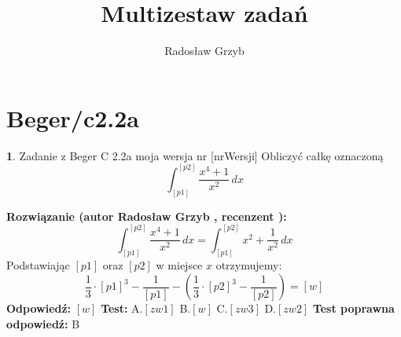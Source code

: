 \documentclass[12pt, a4paper]{article}
\title{Multizestaw zadań}
\author{Radosław Grzyb}
\date{}
\theoremstyle{definition} %
\newtheorem{zad}{}
\newcommand{\kategoria}[1]{\section{#1}} %
\newcommand{\zadStart}[1]{\begin{zad}#1\newline} %
\newcommand{\zadStop}{\end{zad}}   %
\newcommand{\rozwStart}[2]{\noindent \textbf{Rozwiązanie (autor #1 , recenzent #2): }\newline} %
\newcommand{\rozwStop}{\newline}                                            %
\newcommand{\odpStart}{\noindent \textbf{Odpowiedź:}\newline}    %
\newcommand{\odpStop}{\newline}                                             %
\newcommand{\testStart}{\noindent \textbf{Test:}\newline} %
\newcommand{\testStop}{\newline} %
\newcommand{\kluczStart}{\noindent \textbf{Test poprawna odpowiedź:}\newline} %
\newcommand{\kluczStop}{\newline} %
\begin{document}
\maketitle
\kategoria{Beger/c2.2a}
\zadStart{Zadanie z Beger C 2.2a moja wersja nr [nrWersji]}
Obliczyć całkę oznaczoną
$$\int_{[p1]}^{[p2]} \frac{x^{4}+1}{x^{2}} \,dx$$
\zadStop
\rozwStart{Radosław Grzyb}{}
$$\int_{[p1]}^{[p2]} \frac{x^{4}+1}{x^{2}} \,dx = \int_{[p1]}^{[p2]} x^{2}+\frac{1}{x^{2}} \,dx$$
Podstawiając $[p1]$ oraz $[p2]$ w miejsce $x$ otrzymujemy:
$$\frac{1}{3}\cdot[p1]^{3}-\frac{1}{[p1]}-(\frac{1}{3}\cdot[p2]^{3}-\frac{1}{[p2]})=[w]$$
\rozwStop
\odpStart
$[w]$
\odpStop
\testStart
A.$[zw1]$
B.$[w]$
C.$[zw3]$
D.$[zw2]$
\testStop
\kluczStart
B
\kluczStop
\end{document}

